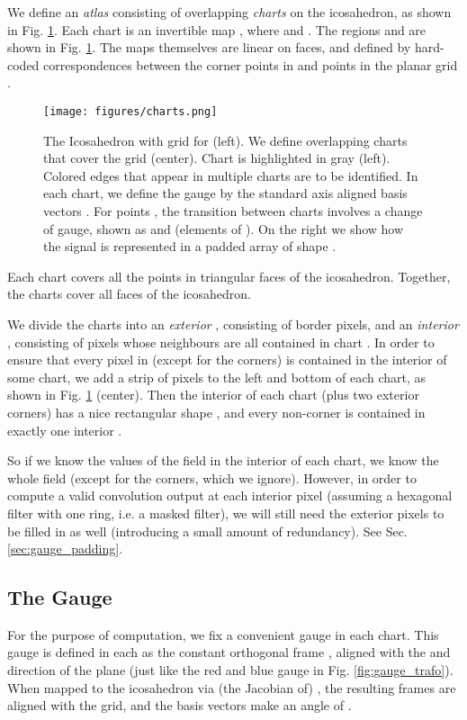 \documentclass{article}
\begin{document}
We define an \emph{atlas} consisting of  overlapping \emph{charts} on the icosahedron, as shown in Fig. \ref{fig:atlas}.
Each chart is an invertible map , where  and .
The regions  and  are shown in Fig. \ref{fig:atlas}.
The maps themselves are linear on faces, and defined by hard-coded correspondences  between the corner points  in  and points  in the planar grid .

\begin{figure}[h!]
    \centering
    \texttt{[image: figures/charts.png]}
    \caption{The Icosahedron with grid  for  (left). We define  overlapping charts that cover the grid (center). Chart  is highlighted in gray (left). Colored edges that appear in multiple charts are to be identified. In each chart, we define the gauge by the standard axis aligned basis vectors . For points , the transition between charts involves a change of gauge, shown as  and  (elements of ).
    On the right we show how the signal is represented in a padded array of shape .}
    \label{fig:atlas}
\end{figure}


Each chart covers all the points in  triangular faces of the icosahedron.
Together, the  charts cover all  faces of the icosahedron.

We divide the charts into an \emph{exterior} , consisting of border pixels, and an \emph{interior} , consisting of pixels whose neighbours are all contained in chart .
In order to ensure that every pixel in  (except for the  corners) is contained in the interior of some chart, we add a strip of pixels to the left and bottom of each chart, as shown in Fig. \ref{fig:atlas} (center).
Then the interior of each chart (plus two exterior corners) has a nice rectangular shape , and every non-corner is contained in exactly one interior .

So if we know the values of the field in the interior of each chart, we know the whole field (except for the corners, which we ignore).
However, in order to compute a valid convolution output at each interior pixel (assuming a hexagonal filter with one ring, i.e. a  masked filter), we will still need the exterior pixels to be filled in as well (introducing a small amount of redundancy).
See Sec. \ref{sec:gauge_padding}.


\subsection{The Gauge}
\label{sec:gauge}

For the purpose of computation, we fix a convenient gauge in each chart. This gauge is defined in each  as the constant orthogonal frame , aligned with the  and  direction of the plane (just like the red and blue gauge in Fig. \ref{fig:gauge_trafo}).
When mapped to the icosahedron via (the Jacobian of) , the resulting frames are aligned with the grid, and the basis vectors make an angle of .
\end{document}
